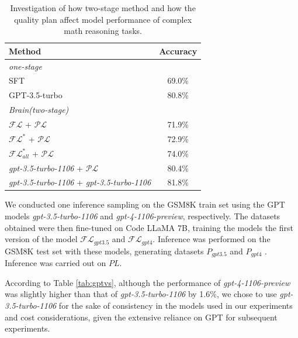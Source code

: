 \documentclass[11pt]{article}
\begin{document}
\begin{table}[h]
\centering
\small
{%
\begin{tabular}{lc}
\hline
\textbf{Method} & \textbf{Accuracy} \\
\hline
\textit{one-stage} & \\
SFT & 69.0\% \\
GPT-3.5-turbo & 80.8\% \\
\hline
\textit{Brain(two-stage)} & \\
$\mathcal{FL}$ + $\mathcal{PL}$ & 71.9\% \\
$\mathcal{FL}^{*}$ + $\mathcal{PL}$ & 72.9\% \\
$\mathcal{FL}^{*}_{all}$ + $\mathcal{PL}$ & 74.0\% \\
\textit{gpt-3.5-turbo-1106} + $\mathcal{PL}$ & 80.4\% \\ 
\textit{gpt-3.5-turbo-1106} + \textit{gpt-3.5-turbo-1106} & 81.8\% \\
\hline
\end{tabular}
}
\caption{Investigation of how two-stage method and how the quality plan affect model performance of complex math reasoning tasks.}
\label{tab:gptvspl}
\end{table}




We conducted one inference sampling on the GSM8K train set using the GPT models \textit{gpt-3.5-turbo-1106} and \textit{gpt-4-1106-preview}, respectively. The datasets obtained were then fine-tuned on Code LLaMA 7B, training the models the first version of the model $\mathcal{FL}_{gpt3.5}$ and $\mathcal{FL}_{gpt4}$. Inference was performed on the GSM8K test set with these models, generating datasets $P_{gpt3.5}$ and $P_{gpt4}$ . Inference was carried out on $PL$.

According to Table \ref{tab:gptvs}, although the performance of \textit{gpt-4-1106-preview} was slightly higher than that of \textit{gpt-3.5-turbo-1106} by 1.6\%, we chose to use \textit{gpt-3.5-turbo-1106} for the sake of consistency in the models used in our experiments and cost considerations, given the extensive reliance on GPT for subsequent experiments.
\end{document}
